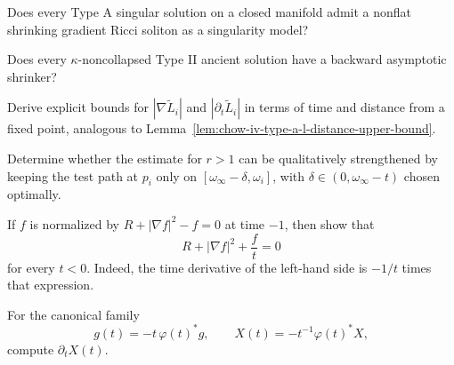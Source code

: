 \begin{conjecture}
\label{conj:chow-iv-type-a-nonflat-shrinker-model}
Does every Type A singular solution on a closed manifold admit a nonflat
shrinking gradient Ricci soliton as a singularity model?
\end{conjecture}

\begin{conjecture}
\label{conj:chow-iv-type-ii-ancient-backward-shrinker}
Does every \(\kappa\)-noncollapsed Type II ancient solution have a backward
asymptotic shrinker?
\end{conjecture}

\begin{example}
\label{ex:chow-iv-explicit-l-distance-derivative-bounds}
Derive explicit bounds for \(|\nabla\widetilde L_i|\) and
\(|\partial_t\widetilde L_i|\) in terms of time and distance from a fixed
point, analogous to Lemma~\ref{lem:chow-iv-type-a-l-distance-upper-bound}.
\end{example}

\begin{example}
\label{ex:chow-iv-optimize-type-a-test-path}
Determine whether the estimate for \(r>1\) can be qualitatively strengthened
by keeping the test path at \(p_i\) only on
\([\omega_\infty-\delta,\omega_i]\), with
\(\delta\in(0,\omega_\infty-t)\) chosen optimally.
\end{example}

\begin{example}
\label{ex:chow-iv-shrinker-canonical-normalization}
If \(f\) is normalized by \(R+|\nabla f|^2-f=0\) at time \(-1\), then
show that
\[
 R+|\nabla f|^2+\frac ft=0
\]
for every \(t<0\).  Indeed, the time derivative of the left-hand side is
\(-1/t\) times that expression.
\end{example}

\begin{example}
\label{ex:chow-iv-shrinker-vector-field-evolution}
For the canonical family
\[
 g(t)=-t\,\varphi(t)^*g,
 \qquad X(t)=-t^{-1}\varphi(t)^*X,
\]
compute \(\partial_tX(t)\).
\end{example}
